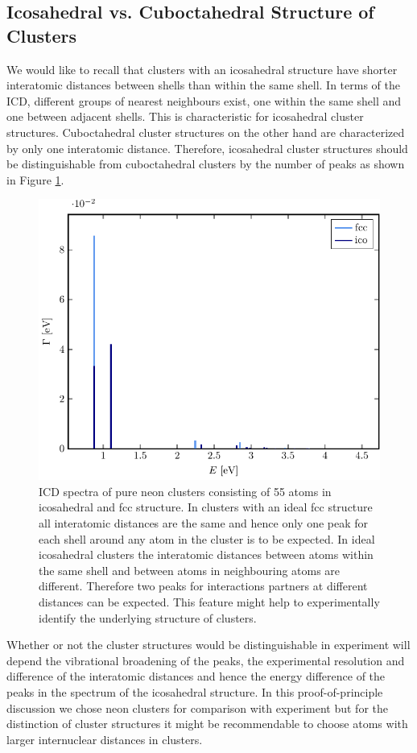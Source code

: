 \subsection{Icosahedral vs. Cuboctahedral Structure of Clusters}
\label{sec:icofcc}
We would like to recall that clusters with an icosahedral structure
have shorter interatomic distances between shells than within the same
shell.
In terms of the ICD, different groups of nearest neighbours exist,
one within the same shell and one
between adjacent shells. This is characteristic for icosahedral cluster structures.
Cuboctahedral cluster structures on the other hand are characterized by only
one interatomic distance. 
Therefore, icosahedral cluster structures should be distinguishable from
cuboctahedral clusters by the number of peaks as shown in Figure
\ref{figure:reinNe}.

\begin{figure}[h]
 \centering
 \includegraphics[width=\columnwidth]{pics/reinNe}
 \caption{ICD spectra of pure neon clusters consisting of 55 atoms in
          icosahedral and fcc structure. In clusters with an ideal fcc structure
          all interatomic distances are the same and hence only one peak
          for each shell around any atom in the cluster is to be expected.
          In ideal icosahedral clusters the interatomic distances between atoms
          within the same shell and between atoms in neighbouring atoms
          are different. Therefore two peaks for interactions partners
          at different distances can be expected. This feature might
          help to experimentally identify the underlying structure of clusters.}
 \label{figure:reinNe}
\end{figure}

Whether or not the cluster structures would be distinguishable in experiment
will depend the vibrational broadening of the peaks, the experimental
resolution and difference of the interatomic distances
and hence the energy difference of the peaks in the spectrum of the
icosahedral structure. In this proof-of-principle discussion
we chose neon clusters for comparison with experiment but for the distinction
of cluster structures it might be recommendable to choose atoms with larger
internuclear distances in clusters.

